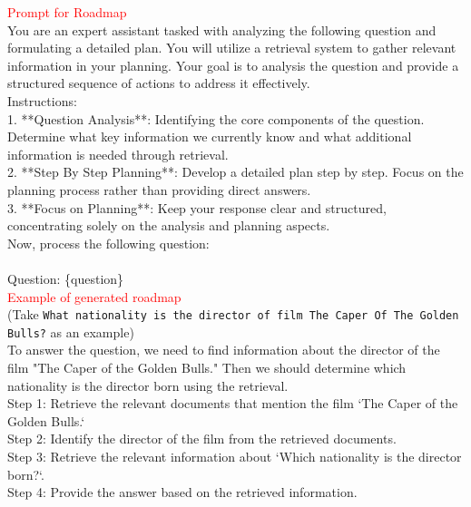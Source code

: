 \begin{tcolorbox}[title=An example of Roadmap,width=\linewidth, breakable]
\begin{small}
\textcolor{red}{Prompt for Roadmap}\\
You are an expert assistant tasked with analyzing the following question and formulating a detailed plan. You will utilize a retrieval system to gather relevant information in your planning. Your goal is to analysis the question and provide a structured sequence of actions to address it effectively.\\

Instructions:\\
1. **Question Analysis**: Identifying the core components of the question. Determine what key information we currently know and what additional information is needed through retrieval.\\
2. **Step By Step Planning**: Develop a detailed plan step by step. Focus on the planning process rather than providing direct answers.\\
3. **Focus on Planning**: Keep your response clear and structured, concentrating solely on the analysis and planning aspects.\\

Now, process the following question:\\
\\
Question: \{question\}\\

\textcolor{red}{Example of generated roadmap}\\
(Take \texttt{What nationality is the director of film The Caper Of The Golden Bulls?} as an example)\\
To answer the question, we need to find information about the director of the film "The Caper of the Golden Bulls." Then we should determine which nationality is the director born using the retrieval.\\
Step 1: Retrieve the relevant documents that mention the film `The Caper of the Golden Bulls.`\\
Step 2: Identify the director of the film from the retrieved documents.\\
Step 3: Retrieve the relevant information about `Which nationality is the director born?`.\\
Step 4: Provide the answer based on the retrieved information.
\end{small}
\end{tcolorbox}
